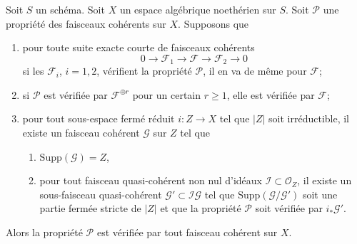 \begin{lemma}
\label{lemma-property-higher-rank-cohomological}
Soit $S$ un schéma. Soit $X$ un espace algébrique noethérien sur $S$.
Soit $\mathcal{P}$ une propriété des faisceaux cohérents sur $X$. Supposons que
\begin{enumerate}
\item pour toute suite exacte courte de faisceaux cohérents
$$
0 \to \mathcal{F}_1 \to \mathcal{F} \to \mathcal{F}_2 \to 0
$$
si les $\mathcal{F}_i$, $i = 1, 2$, vérifient la propriété $\mathcal{P}$,
il en va de même pour $\mathcal{F}$;
\item si $\mathcal{P}$ est vérifiée par $\mathcal{F}^{\oplus r}$ pour
un certain $r \geq 1$, elle est vérifiée par $\mathcal{F}$;
\item pour tout sous-espace fermé réduit $i : Z \to X$ tel que
$|Z|$ soit irréductible, il existe un faisceau cohérent $\mathcal{G}$ sur $Z$
tel que
\begin{enumerate}
\item $\text{Supp}(\mathcal{G}) = Z$,
\item pour tout faisceau quasi-cohérent non nul d'idéaux
$\mathcal{I} \subset \mathcal{O}_Z$, il existe un sous-faisceau quasi-cohérent
$\mathcal{G}' \subset \mathcal{I}\mathcal{G}$ tel que
$\text{Supp}(\mathcal{G}/\mathcal{G}')$ soit une partie fermée stricte de $|Z|$
et que la propriété $\mathcal{P}$ soit vérifiée par $i_*\mathcal{G}'$.
\end{enumerate}
\end{enumerate}
Alors la propriété $\mathcal{P}$ est vérifiée par tout faisceau cohérent sur $X$.
\end{lemma}

